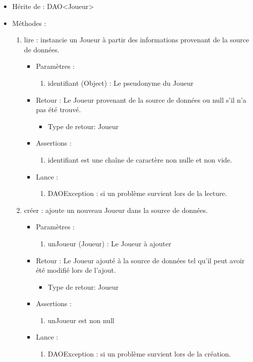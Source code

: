\begin{itemize}
\item Hérite de : DAO<Joueur>

\item Méthodes : 

  \begin{enumerate}
  \item lire : instancie un Joueur à partir des informations provenant de la source de données.
    \begin{itemize}
    \item Paramètres : 
      \begin{enumerate}
      \item identifiant (Object) : Le pseudonyme du Joueur
      \end{enumerate}
    \item Retour : Le Joueur provenant de la source de données ou null s'il n'a pas été trouvé.
      \begin{itemize}
      \item Type de retour: Joueur
      \end{itemize}
    \item Assertions : 
      \begin{enumerate}
      \item identifiant est une chaîne de caractère non nulle et non vide.
      \end{enumerate}
    \item Lance :
      \begin{enumerate}
      \item DAOException : si un problème survient lors de la lecture.
      \end{enumerate}
    \end{itemize}

  \item créer : ajoute un nouveau Joueur dans la source de données.
    \begin{itemize}
    \item Paramètres : 
      \begin{enumerate}
      \item unJoueur (Joueur) : Le Joueur à ajouter
      \end{enumerate}
    \item Retour : Le Joueur ajouté à la source de données tel qu'il peut avoir été modifié lors de l'ajout.
      \begin{itemize}
      \item Type de retour: Joueur
      \end{itemize}
    \item Assertions : 
      \begin{enumerate}
      \item unJoueur est non null
      \end{enumerate}
    \item Lance :
      \begin{enumerate}
      \item DAOException : si un problème survient lors de la création.
      \end{enumerate}
    \end{itemize}


\end{enumerate}
\end{itemize}
